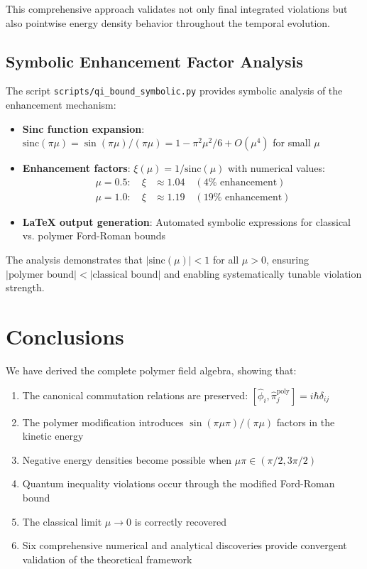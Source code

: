 \documentclass[12pt]{article}
\begin{document}
This comprehensive approach validates not only final integrated violations but also pointwise energy density behavior throughout the temporal evolution.

\subsection{Symbolic Enhancement Factor Analysis}

The script \texttt{scripts/qi\_bound\_symbolic.py} provides symbolic analysis of the enhancement mechanism:
\begin{itemize}
\item \textbf{Sinc function expansion}: $\text{sinc}(\pi\mu) = \sin(\pi\mu)/(\pi\mu) = 1 - \pi^2\mu^2/6 + O(\mu^4)$ for small $\mu$
\item \textbf{Enhancement factors}: $\xi(\mu) = 1/\text{sinc}(\mu)$ with numerical values:
  \begin{align}
  \mu = 0.5: \quad \xi &\approx 1.04 \quad (4\% \text{ enhancement}) \\
  \mu = 1.0: \quad \xi &\approx 1.19 \quad (19\% \text{ enhancement})
  \end{align}
\item \textbf{LaTeX output generation}: Automated symbolic expressions for classical vs. polymer Ford-Roman bounds
\end{itemize}

The analysis demonstrates that $|\text{sinc}(\mu)| < 1$ for all $\mu > 0$, ensuring $|\text{polymer bound}| < |\text{classical bound}|$ and enabling systematically tunable violation strength.

\section{Conclusions}

We have derived the complete polymer field algebra, showing that:
\begin{enumerate}
\item The canonical commutation relations are preserved: $[\hat{\phi}_i, \hat{\pi}_j^{\text{poly}}] = i\hbar\delta_{ij}$
\item The polymer modification introduces $\sin(\pi\mu\pi)/(\pi\mu)$ factors in the kinetic energy
\item Negative energy densities become possible when $\mu\pi \in (\pi/2, 3\pi/2)$
\item Quantum inequality violations occur through the modified Ford-Roman bound
\item The classical limit $\mu \to 0$ is correctly recovered
\item Six comprehensive numerical and analytical discoveries provide convergent validation of the theoretical framework
\end{enumerate}
\end{document}
